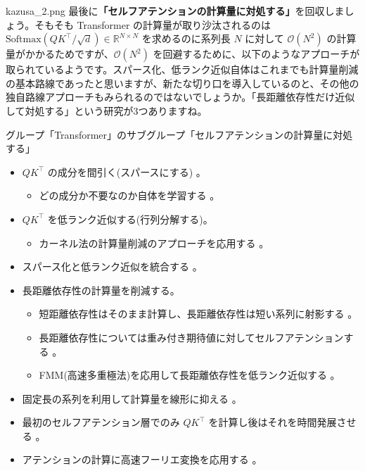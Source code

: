 \documentclass[b5paper,xelatex,ja=standard,10pt]{bxjsarticle}
\begin{document}
\begin{SERIFU}[colback=PaleIris, colbacktitle=PaleIris2]{kazusa_2.png}
最後に\textbf{「セルフアテンションの計算量に対処する」}を回収しましょう。そもそも Transformer の計算量が取り沙汰されるのは $\mathrm{Softmax} \left( Q K ^\top / \sqrt{d} \right) \in \mathbb{R}^{N \times N}$ を求めるのに系列長 $N$ に対して $\mathcal{O}(N^2)$ の計算量がかかるためですが、$\mathcal{O}(N^2)$ を回避するために、以下のようなアプローチが取られているようです。スパース化、低ランク近似自体はこれまでも計算量削減の基本路線であったと思いますが、新たな切り口を導入しているのと、その他の独自路線アプローチもみられるのではないでしょうか。「長距離依存性だけ近似して対処する」という研究が3つありますね。
\end{SERIFU}

\vspace{1pt}
\begin{PROP2}[left=0pt]{グループ「Transformer」のサブグループ「セルフアテンションの計算量に対処する」}
\begin{itemize}
  \item $Q K ^\top$ の成分を間引く(スパースにする) 。
  \begin{itemize}
    \item どの成分か不要なのか自体を学習する \cite{SebastianJaszczur2021}。
  \end{itemize}
  \vspace{6pt}
  \item $Q K ^\top$ を低ランク近似する(行列分解する)。
  \begin{itemize}
    \item カーネル法の計算量削減のアプローチを応用する \cite{YifanChen2021}。
  \end{itemize}
  \vspace{6pt}
  \item スパース化と低ランク近似を統合する \cite{BeidiChen2021}。
  \vspace{6pt}
  \item 長距離依存性の計算量を削減する。
  \begin{itemize}
    \item 短距離依存性はそのまま計算し、長距離依存性は短い系列に射影する \cite{ChenZhu2021}。
    \item 長距離依存性については重み付き期待値に対してセルフアテンションする \cite{HongyuRen2021}。
    \item FMM(高速多重極法)を応用して長距離依存性を低ランク近似する \cite{TanNguyen2021}。
  \end{itemize}
  \vspace{6pt}
  \item 固定長の系列を利用して計算量を線形に抑える \cite{XuezheMa2021}。
  \vspace{6pt}
  \item 最初のセルフアテンション層でのみ $Q K ^\top$ を計算し後はそれを時間発展させる \cite{SubhabrataDutta2021}。
  \vspace{6pt}
  \item アテンションの計算に高速フーリエ変換を応用する \cite{ShengjieLuo2021}。
\end{itemize}
\end{PROP2}
\end{document}
